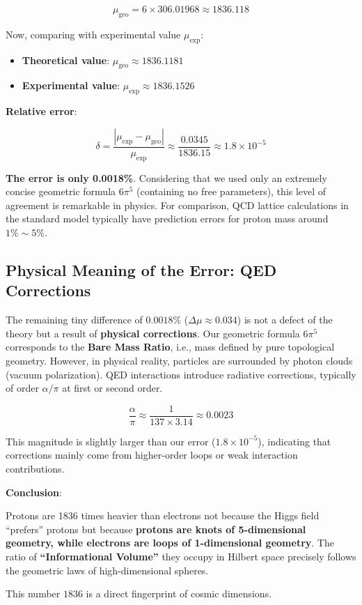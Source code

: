 \[\mu_{\text{geo}} = 6 \times 306.01968 \approx 1836.118\]

Now, comparing with experimental value $\mu_{\text{exp}}$:

\begin{itemize}
\item \textbf{Theoretical value}: $\mu_{\text{geo}} \approx 1836.1181$
\item \textbf{Experimental value}: $\mu_{\text{exp}} \approx 1836.1526$
\end{itemize}

\textbf{Relative error}:

\[\delta = \frac{|\mu_{\text{exp}} - \mu_{\text{geo}}|}{\mu_{\text{exp}}} \approx \frac{0.0345}{1836.15} \approx 1.8 \times 10^{-5}\]

\textbf{The error is only 0.0018\%}.
Considering that we used only an extremely concise geometric formula $6\pi^5$ (containing no free parameters), this level of agreement is remarkable in physics. For comparison, QCD lattice calculations in the standard model typically have prediction errors for proton mass around $1\% \sim 5\%$.

\subsection{Physical Meaning of the Error: QED Corrections}

The remaining tiny difference of $0.0018\%$ ($\Delta \mu \approx 0.034$) is not a defect of the theory but a result of \textbf{physical corrections}.
Our geometric formula $6\pi^5$ corresponds to the \textbf{Bare Mass Ratio}, i.e., mass defined by pure topological geometry.
However, in physical reality, particles are surrounded by photon clouds (vacuum polarization). QED interactions introduce radiative corrections, typically of order $\alpha / \pi$ at first or second order.

\[\frac{\alpha}{\pi} \approx \frac{1}{137 \times 3.14} \approx 0.0023\]

This magnitude is slightly larger than our error ($1.8 \times 10^{-5}$), indicating that corrections mainly come from higher-order loops or weak interaction contributions.

\textbf{Conclusion}:

Protons are 1836 times heavier than electrons not because the Higgs field ``prefers'' protons but because \textbf{protons are knots of 5-dimensional geometry, while electrons are loops of 1-dimensional geometry}. The ratio of \textbf{``Informational Volume''} they occupy in Hilbert space precisely follows the geometric laws of high-dimensional spheres.

This number $1836$ is a direct fingerprint of cosmic dimensions.
